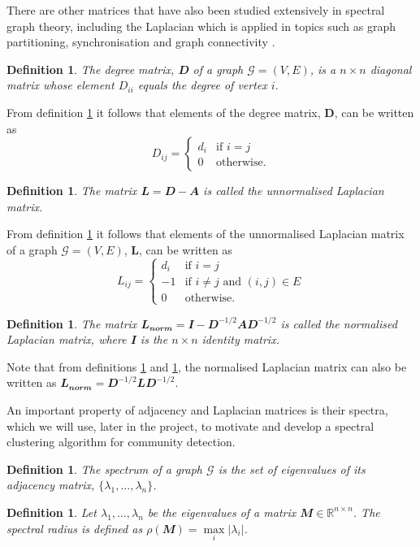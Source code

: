 \documentclass[12pt]{article}
\numberwithin{equation}{section}
\newtheorem{definition}[theorem]{Definition}
\begin{document}
There are other matrices that have also been studied extensively in spectral graph theory, including the Laplacian which is applied in topics such as graph partitioning, synchronisation and graph connectivity \cite{For10}.
\begin{definition}
\label{def:degreeMatrix}
	The degree matrix, $\mathbfit{D}$ of a graph $\mathcal{G} = (V,E)$, is a $n \times n$ diagonal matrix whose element $D_{ii}$ equals the degree of vertex $i$.
\end{definition}
From definition \ref{def:degreeMatrix} it follows that elements of the degree matrix, $\mathbf{D}$, can be written as
\begin{equation*}
	 D_{ij} =
	\begin{cases}
		d_{i} & \text{if } i = j\\
		0 & \text{otherwise}.
	\end{cases}
\end{equation*}
\begin{definition}
\label{def:unnormalisedLaplacianMatrix}
	The matrix $\mathbfit{L} = \mathbfit{D}  - \mathbfit{A} $ is called the unnormalised Laplacian matrix.
\end{definition}
From definition \ref{def:unnormalisedLaplacianMatrix} it follows that elements of the unnormalised Laplacian matrix of a graph $\mathcal{G} = (V,E)$, $\mathbf{L}$, can be written as
\begin{equation*}
	L_{ij} =
	\begin{cases}
		d_{i} & \text{if } i = j\\
		-1 & \text{if } i \neq j \text{ and }  (i,j) \in E\\
		0 & \text{otherwise}.
	\end{cases}
\end{equation*}
\begin{definition}
\label{def:normalisedLaplacianMatrix}
	The matrix $\mathbfit{L_{norm}} = \mathbfit{I}  - \mathbfit{D}^{-1/2}\mathbfit{A}\mathbfit{D}^{-1/2}$ is called the normalised Laplacian matrix, where $\mathbfit{I}$ is the $n \times n$ identity matrix.
\end{definition}
Note that from definitions \ref{def:unnormalisedLaplacianMatrix} and \ref{def:normalisedLaplacianMatrix}, the normalised Laplacian matrix can also be written as $\mathbfit{L_{norm}} = \mathbfit{D}^{-1/2}\mathbfit{L}\mathbfit{D}^{-1/2}$.

An important property of adjacency and Laplacian matrices is their spectra, which we will use, later in the project, to motivate and develop a spectral clustering algorithm for community detection.
\begin{definition}
\label{def:spectrum}
	The spectrum of a graph $\mathcal{G}$ is the set of eigenvalues of its adjacency matrix, $\{\lambda_{1},\dots,\lambda_{n}\}$.
\end{definition}
\begin{definition}
\label{def:spectralRadius}
	Let $\lambda_{1},\dots,\lambda_{n}$ be the eigenvalues of a matrix $\mathbfit{M} \in \mathbb{R}^{n \times n}$. The spectral radius is defined as $\rho(\mathbfit{M}) = \max\limits_{i} \vert\lambda_{i}\vert$.
\end{definition}
\end{document}

